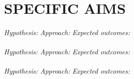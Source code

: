 \documentclass[../main.tex]{subfiles}
\begin{document}
\part{SPECIFIC AIMS}

\lipsum

\subsection*{\AimOneText}
\textit{Hypothesis:} 
\textit{Approach:} 
\textit{Expected outcomes:} 

\subsection*{\AimTwoText}
\textit{Hypothesis:} 
\textit{Approach:}
\textit{Expected outcomes:}

\subsection*{\AimThreeText}
\textit{Hypothesis:}
\textit{Approach:}
\textit{Expected outcomes:}
\end{document}

